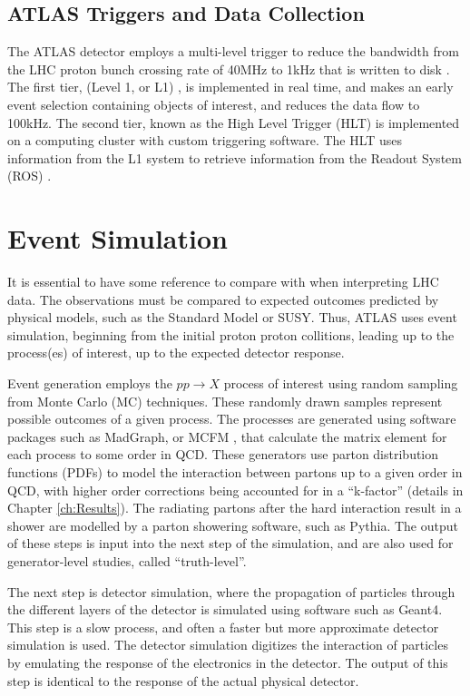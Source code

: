 \documentclass[11pt,a4paper,openright,twoside]{report}
\begin{document}
\subsection{ATLAS Triggers and Data Collection}
The ATLAS detector employs a multi-level trigger to reduce the bandwidth from the LHC proton bunch crossing rate of 40MHz to 1kHz that is written to disk \cite{trigger1,trigger2}. The first tier, (Level 1, or L1) \cite{L1}, is implemented in real time, and makes an early event selection containing objects of interest, and reduces the data flow to 100kHz. The second tier, known as the High Level Trigger (HLT) \cite{HLT} is implemented on a computing cluster with custom triggering software. The HLT uses information from the L1 system to retrieve information from the Readout System (ROS) \cite{ROS}.

\section{Event Simulation}
It is essential to have some reference to compare with when interpreting LHC data. The observations must be compared to expected outcomes predicted by physical models, such as the Standard Model or SUSY. Thus, ATLAS uses event simulation, beginning from the initial proton proton collitions, leading up to the process(es) of interest, up to the expected detector response.

Event generation employs the $pp\to X$ process of interest using random sampling from Monte Carlo (MC) techniques. These randomly drawn samples represent possible outcomes of a given process. The processes are generated using software packages such as MadGraph\cite{MadGraph}, or MCFM \cite{MCFM}, that calculate the matrix element for each process to some order in QCD. These generators use parton distribution functions (PDFs) to model the interaction between partons up to a given order in QCD, with higher order corrections being accounted for in a ``k-factor'' (details in Chapter \ref{ch:Results}). The radiating partons after the hard interaction result in a shower are modelled by a parton showering software, such as Pythia\cite{pythia}. The output of these steps is input into the next step of the simulation, and are also used for generator-level studies, called ``truth-level''.

The next step is detector simulation, where the propagation of particles through the different layers of the detector is simulated using software such as Geant4\cite{geant4}. This step is a slow process, and often a faster but more approximate detector simulation is used. The detector simulation digitizes the interaction of particles by emulating the response of the electronics in the detector. The output of this step is identical to the response of the actual physical detector.
\end{document}
